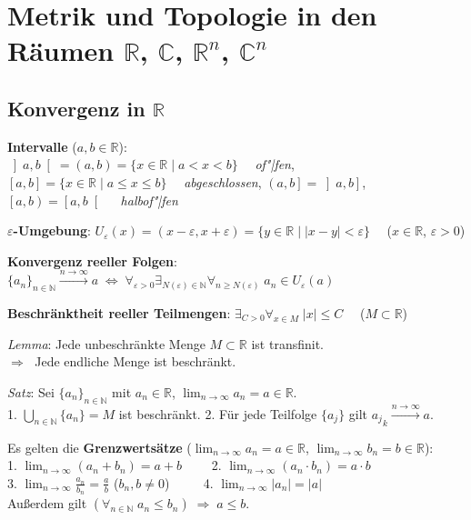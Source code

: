 \chapter{%
    Metrik und Topologie in den Räumen
    \texorpdfstring
    {$\mathbb{R}$, $\mathbb{C}$, $\mathbb{R}^n$, $\mathbb{C}^n$}%
    {ℝ, ℂ, ℝⁿ, ℂⁿ}%
}

\section{%
    \texorpdfstring{Konvergenz in $\mathbb{R}$}{Konvergenz in ℝ}%
}

\textbf{Intervalle} ($a, b \in \mathbb{R}$): \\
$\left]a,b\right[ = \left(a,b\right) =
\{x \in \mathbb{R} \;|\; a < x < b\} \quad$ \emph{of"|fen}, \\
$\left[a,b\right] =
\{x \in \mathbb{R} \;|\; a \le x \le b\} \quad$ \emph{abgeschlossen}, \qquad
$\left(a,b\right] = \left]a,b\right]$,
$\left[a,b\right) = \left[a,b\right[ \quad$ \emph{halbof"|fen}

\textbf{$\varepsilon$-Umgebung}: $U_\varepsilon(x) =
(x - \varepsilon, x + \varepsilon) =
\{y \in \mathbb{R} \;|\; |x - y| < \varepsilon\} \quad$
($x \in \mathbb{R}$, $\varepsilon > 0$)

\textbf{Konvergenz reeller Folgen}:
$\{a_n\}_{n \in \mathbb{N}} \xrightarrow{n \to \infty} a \;\Leftrightarrow\;
\forall_{\varepsilon > 0} \exists_{N(\varepsilon) \in \mathbb{N}}
\forall_{n \ge N(\varepsilon)}\; a_n \in U_\varepsilon(a)$

\textbf{Beschränktheit reeller Teilmengen}:
$\exists_{C > 0} \forall_{x \in M}\; |x| \le C \quad$ ($M \subset \mathbb{R}$)

\emph{Lemma}: Jede unbeschränkte Menge $M \subset \mathbb{R}$ ist
transfinit. \\
$\Rightarrow\;$ Jede endliche Menge ist beschränkt.

\emph{Satz}: Sei $\{a_n\}_{n \in \mathbb{N}}$ mit $a_n \in \mathbb{R}$,
$\lim_{n \to \infty} a_n = a \in \mathbb{R}$. \\
1. $\bigcup_{n \in \mathbb{N}} \{a_n\} = M$ ist beschränkt.
2. Für jede Teilfolge $\{a_j\}$ gilt ${a_j}_k \xrightarrow{n \to \infty} a$.

Es gelten die \textbf{Grenzwertsätze}
($\lim_{n \to \infty} a_n = a \in \mathbb{R}$,
$\lim_{n \to \infty} b_n = b \in \mathbb{R}$): \\
1. $\lim_{n \to \infty} (a_n + b_n) = a + b \qquad$
2. $\lim_{n \to \infty} (a_n \cdot b_n) = a \cdot b$ \\
3. $\lim_{n \to \infty} \frac{a_n}{b_n} = \frac{a}{b}$
($b_n, b \not= 0$) $\qquad$
4. $\lim_{n \to \infty} |a_n| = |a|$ \\
Außerdem gilt
$(\forall_{n \in \mathbb{N}}\; a_n \le b_n) \;\Rightarrow\; a \le b$.

